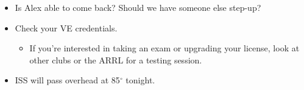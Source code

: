 \documentclass[12pt, letterpaper]{article}
\begin{document}
\begin{enumerate}
\begin{itemize}
                \begin{itemize}
                    \item Day Pond again. Shouldn't have much foot traffic.
                    \item Nov. 14 as a possible day
                \end{itemize}
            \item Is Alex able to come back? Should we have someone else step-up?
            \item Check your VE credentials.
                \begin{itemize}
                    \item If you're interested in taking an exam or upgrading your license, look at other clubs or the ARRL for a testing session.
                \end{itemize}
            \item ISS will pass overhead at 85$^\circ$ tonight.
        \end{itemize}
    \end{enumerate}
\end{document}
